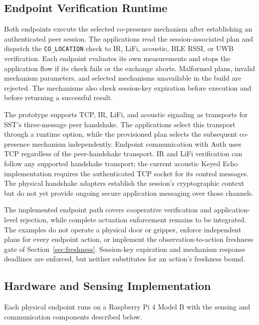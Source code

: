 \documentclass[sigconf,authordraft]{acmart}
\begin{document}
\subsection{Endpoint Verification Runtime}
\label{sec:implementation-runtime}

Both endpoints execute the selected co-presence mechanism after establishing an authenticated peer session.
The applications read the session-associated plan and dispatch the \texttt{CO\_LOCATION} check to IR, LiFi, acoustic, BLE RSSI, or UWB verification.
Each endpoint evaluates its own measurements and stops the application flow if its check fails or the exchange aborts.
Malformed plans, invalid mechanism parameters, and selected mechanisms unavailable in the build are rejected.
The mechanisms also check session-key expiration before execution and before returning a successful result.

The prototype supports TCP, IR, LiFi, and acoustic signaling as transports for SST's three-message peer handshake.
The applications select this transport through a runtime option, while the provisioned plan selects the subsequent co-presence mechanism independently.
Endpoint communication with Auth uses TCP regardless of the peer-handshake transport.
IR and LiFi verification can follow any supported handshake transport; the current acoustic Keyed Echo implementation requires the authenticated TCP socket for its control messages.
The physical handshake adapters establish the session's cryptographic context but do not yet provide ongoing secure application messaging over those channels.

The implemented endpoint path covers cooperative verification and application-level rejection, while complete actuation enforcement remains to be integrated.
The examples do not operate a physical door or gripper, enforce independent plans for every endpoint action, or implement the observation-to-action freshness gate of Section~\ref{sec:freshness}.
Session-key expiration and mechanism response deadlines are enforced, but neither substitutes for an action's freshness bound.

\subsection{Hardware and Sensing Implementation}
\label{sec:implementation-mechanisms}

Each physical endpoint runs on a Raspberry Pi 4 Model B with the sensing and communication components described below.
\end{document}
